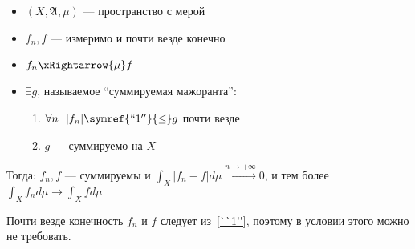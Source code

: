\begin{theorem}\itemfix
    \label{лебега}
    \begin{itemize}
        \item \((X, \mathfrak{A}, \mu)\) --- пространство с мерой
        \item \(f_n, f\) --- измеримо и почти везде конечно
        \item \(f_n \xRightarrow{\mu} f\)
        \item \(\exists g\), называемое ``суммируемая мажоранта'':
              \begin{enumerate}
                  \item \(\forall n \ \ |f_n| \symref{``1''}{\leq} g\) почти везде
                  \item \(g\) --- суммируемо на \(X\)
              \end{enumerate}
    \end{itemize}

    Тогда: \(f_n, f\) --- суммируемы и \(\int_X |f_n - f| d\mu \xrightarrow{n \to +\infty} 0\), и тем более \(\int_X f_n d\mu \to \int_X f d\mu\)
\end{theorem}
\begin{remark}
    Почти везде конечность \(f_n\) и \(f\) следует из~\eqref{``1''}, поэтому в условии этого можно не требовать.
\end{remark}
